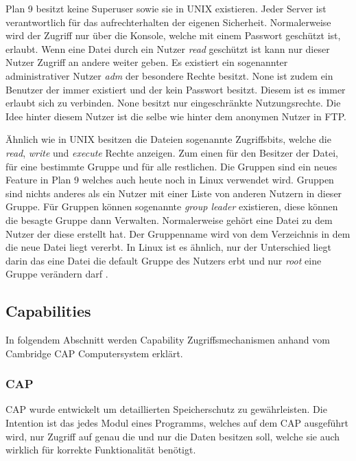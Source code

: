 \documentclass[11pt,technote]{IEEEtran}
\begin{document}
        Plan 9 besitzt keine Superuser sowie sie in UNIX existieren. Jeder Server ist verantwortlich f\"ur das aufrechterhalten der eigenen Sicherheit.
        Normalerweise wird der Zugriff nur \"uber die Konsole, welche mit einem Passwort gesch\"utzt ist, erlaubt.
        Wenn eine Datei durch ein Nutzer \textit{read} gesch\"utzt ist kann nur dieser Nutzer Zugriff an andere weiter geben.
        Es existiert ein sogenannter administrativer Nutzer \textit{adm} der besondere Rechte besitzt. 
        None ist zudem ein Benutzer der immer existiert und der kein Passwort besitzt.
        Diesem ist es immer erlaubt sich zu verbinden. None besitzt nur eingeschr\"ankte Nutzungsrechte. Die Idee hinter diesem Nutzer ist die selbe
        wie hinter dem anonymen Nutzer in FTP.
       
        \"Ahnlich wie in UNIX besitzen die Dateien sogenannte Zugriffsbits, welche die \textit{read}, \textit{write} und \textit{execute} Rechte anzeigen. 
         Zum einen f\"ur den Besitzer der Datei, f\"ur eine bestimmte Gruppe und f\"ur alle restlichen.
         Die Gruppen sind ein neues Feature in Plan 9 welches auch heute noch in Linux verwendet wird. Gruppen sind nichts anderes
         als ein Nutzer mit einer Liste von anderen Nutzern in dieser Gruppe. F\"ur Gruppen k\"onnen sogenannte \textit{group leader} existieren, diese k\"onnen die
         besagte Gruppe dann Verwalten. Normalerweise geh\"ort eine Datei zu dem Nutzer der diese erstellt hat. 
         Der Gruppenname wird von dem Verzeichnis in dem die neue Datei liegt vererbt. In Linux ist es \"ahnlich, nur der Unterschied liegt darin
         das eine Datei die default Gruppe des Nutzers erbt und nur \textit{root} eine Gruppe ver\"andern darf \cite{Url:linux:groups} \cite{Url:linux:groupmod}.
    \subsection{Capabilities} \label{sec:secure:capability}
      In folgendem Abschnitt werden Capability Zugriffsmechanismen anhand vom Cambridge CAP Computersystem erkl\"art.
      \subsubsection{CAP}
		     CAP wurde entwickelt um detaillierten Speicherschutz zu gew\"ahrleisten. Die Intention ist das jedes Modul eines Programms,
		     welches auf dem CAP ausgef\"uhrt wird, nur Zugriff auf genau die und nur die Daten besitzen soll,
		     welche sie auch wirklich f\"ur korrekte Funktionalit\"at ben\"otigt.
		     
\end{document}
